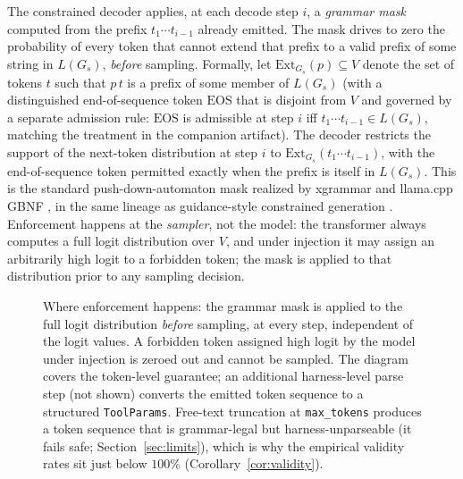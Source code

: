 The constrained decoder applies, at each decode step \(i\), a \emph{grammar mask} computed from the prefix \(t_1 \cdots t_{i-1}\) already emitted. The mask drives to zero the probability of every token that cannot extend that prefix to a valid prefix of some string in \(L(G_s)\), \emph{before} sampling. Formally, let \(\mathrm{Ext}_{G_s}(p) \subseteq V\) denote the set of tokens \(t\) such that \(p\,t\) is a prefix of some member of \(L(G_s)\) (with a distinguished end-of-sequence token \(\mathrm{EOS}\) that is disjoint from \(V\) and governed by a separate admission rule: \(\mathrm{EOS}\) is admissible at step \(i\) iff \(t_1 \cdots t_{i-1} \in L(G_s)\), matching the treatment in the companion artifact). The decoder restricts the support of the next-token distribution at step \(i\) to \(\mathrm{Ext}_{G_s}(t_1 \cdots t_{i-1})\), with the end-of-sequence token permitted exactly when the prefix is itself in \(L(G_s)\). This is the standard push-down-automaton mask realized by xgrammar \cite{dong2024xgrammar} and llama.cpp GBNF \cite{gerganov_llamacpp}, in the same lineage as guidance-style constrained generation \cite{willard2023}. Enforcement happens at the \emph{sampler}, not the model: the transformer always computes a full logit distribution over \(V\), and under injection it may assign an arbitrarily high logit to a forbidden token; the mask is applied to that distribution prior to any sampling decision.

\begin{figure}[t]
\centering
{}
\caption{Where enforcement happens: the grammar mask is applied to the full logit distribution \emph{before} sampling, at every step, independent of the logit values. A forbidden token assigned high logit by the model under injection is zeroed out and cannot be sampled. The diagram covers the token-level guarantee; an additional harness-level parse step (not shown) converts the emitted token sequence to a structured \texttt{ToolParams}. Free-text truncation at \texttt{max\_tokens} produces a token sequence that is grammar-legal but harness-unparseable (it fails safe; Section~\ref{sec:limits}), which is why the empirical validity rates sit just below \(100\%\) (Corollary~\ref{cor:validity}).}
\label{fig:mask-locus}
\end{figure}

